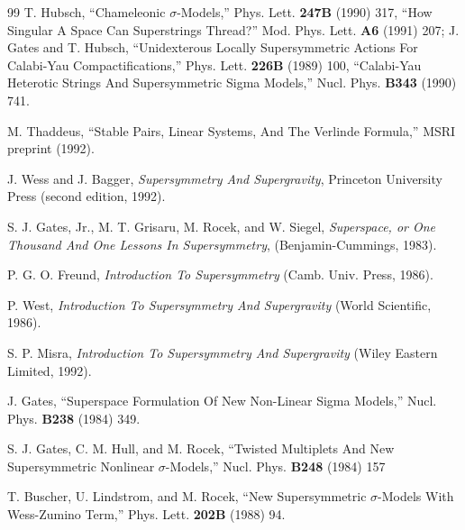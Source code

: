 \begin{thebibliography}{99}
\label{op:88}
 T. Hubsch, ``Chameleonic $\sigma$-Models,'' Phys. Lett. \textbf{247B} (1990) 317, ``How Singular A Space Can Superstrings Thread?'' Mod. Phys. Lett. \textbf{A6} (1991) 207; J. Gates and T. Hubsch, ``Unidexterous Locally Supersymmetric Actions For Calabi-Yau Compactifications,'' Phys. Lett. \textbf{226B} (1989) 100, ``Calabi-Yau Heterotic Strings And Supersymmetric Sigma Models,'' Nucl. Phys. \textbf{B343} (1990) 741.

 M. Thaddeus, ``Stable Pairs, Linear Systems, And The Verlinde Formula,'' MSRI preprint (1992).

 J. Wess and J. Bagger, \textit{Supersymmetry And Supergravity}, Princeton University Press (second edition, 1992).

 S. J. Gates, Jr., M. T. Grisaru, M. Rocek, and W. Siegel, \textit{Superspace, or One Thousand And One Lessons In Supersymmetry}, (Benjamin-Cummings, 1983).

 P. G. O. Freund, \textit{Introduction To Supersymmetry} (Camb. Univ. Press, 1986).

 P. West, \textit{Introduction To Supersymmetry And Supergravity} (World Scientific, 1986).

 S. P. Misra, \textit{Introduction To Supersymmetry And Supergravity} (Wiley Eastern Limited, 1992).

 J. Gates, ``Superspace Formulation Of New Non-Linear Sigma Models,'' Nucl. Phys. \textbf{B238} (1984) 349.

 S. J. Gates, C. M. Hull, and M. Rocek, ``Twisted Multiplets And New Supersymmetric Nonlinear $\sigma$-Models,'' Nucl. Phys. \textbf{B248} (1984) 157

 T. Buscher, U. Lindstrom, and M. Rocek, ``New Supersymmetric $\sigma$-Models With Wess-Zumino Term,'' Phys. Lett. \textbf{202B} (1988) 94.


\end{thebibliography}
